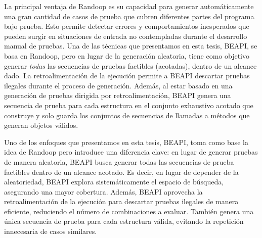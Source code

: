 La principal ventaja de \textsf{Randoop} es su capacidad para generar automáticamente una gran cantidad de casos de prueba que cubren diferentes partes del programa bajo prueba. Esto permite detectar errores y comportamientos inesperados que pueden surgir en situaciones de entrada no contempladas durante el desarrollo manual de pruebas.
Una de las técnicas que presentamos en esta tesis, \textsf{BEAPI}, se basa en \textsf{Randoop}, pero en lugar de la generación aleatoria, tiene como objetivo generar \emph{todas} las secuencias de pruebas factibles (acotadas), dentro de un alcance dado. La retroalimentación de la ejecución permite a \textsf{BEAPI} descartar pruebas ilegales durante el proceso de generación. Además, al estar basado en una generación de pruebas dirigida por retroalimentación, \textsf{BEAPI} genera una secuencia de prueba para cada estructura en el conjunto exhaustivo acotado que construye y solo guarda los conjuntos de secuencias de llamadas a métodos que generan objetos válidos.

Uno de los enfoques que presentamos en esta tesis, BEAPI, toma como base la idea de Randoop pero introduce una diferencia clave: en lugar de generar pruebas de manera aleatoria, 
BEAPI busca generar todas las secuencias de prueba factibles dentro de un alcance acotado. Es decir, en lugar de depender de la aleatoriedad, 
BEAPI explora sistemáticamente el espacio de búsqueda, asegurando una mayor cobertura.
Además, BEAPI aprovecha la retroalimentación de la ejecución para descartar pruebas ilegales de manera eficiente, 
reduciendo el número de combinaciones a evaluar. También genera una única secuencia de prueba para cada estructura válida, 
evitando la repetición innecesaria de casos similares.





